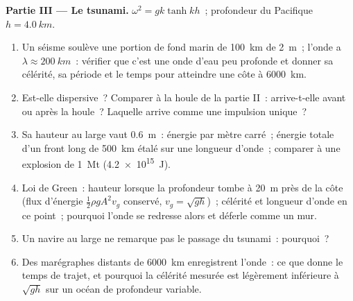 \begin{problem}
\medskip
\noindent\textbf{Partie III --- Le tsunami.}
$\omega^2 = gk\tanh kh$~; profondeur du Pacifique $h = \qty{4.0}{km}$.
\begin{enumerate}[resume]
  \item Un séisme soulève une portion de fond marin de \qty{100}{km} de
        \qty{2}{m}~; l'onde a $\lambda \approx \qty{200}{km}$~: vérifier que c'est une
        onde d'eau peu profonde et donner sa célérité, sa période et le temps pour
        atteindre une côte à \qty{6000}{km}.
  \item Est-elle dispersive~? Comparer à la houle de la partie II~: arrive-t-elle
        avant ou après la houle~? Laquelle arrive comme
        une impulsion unique~?
  \item Sa hauteur au large vaut \qty{0.6}{m}~: énergie par mètre carré~;
        énergie totale d'un front long de \qty{500}{km} étalé sur une
        longueur d'onde~; comparer à une explosion de \qty{1}{Mt} (\qty{4.2e15}{J}).
  \item Loi de Green~: hauteur lorsque la profondeur tombe à \qty{20}{m} près de la
        côte (flux d'énergie $\tfrac12\rho gA^2v_g$ conservé, $v_g = \sqrt{gh}$)~;
        célérité et longueur d'onde en ce point~; pourquoi l'onde se redresse alors et
        déferle comme un mur.
  \item Un navire au large ne remarque pas le passage du tsunami~: pourquoi~?
  \item Des marégraphes distants de \qty{6000}{km} enregistrent l'onde~: ce que donne
        le temps de trajet, et pourquoi la célérité mesurée est légèrement
        inférieure à $\sqrt{gh}$ sur un océan de profondeur variable.
\end{enumerate}


\end{problem}
